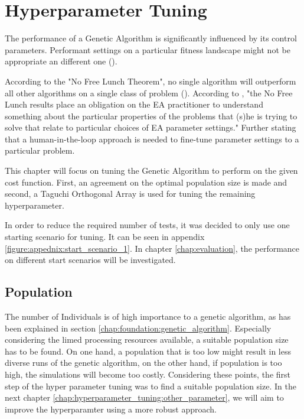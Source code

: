\chapter{Hyperparameter Tuning}
\label{chap:hyperparameter_tuning}

The performance of a Genetic Algorithm is significantly influenced by its control parameters. Performant settings on a particular fitness landscape might not be appropriate an different one (\cite{kacprzyk_parameter_2007}).

According to the "No Free Lunch Theorem", no single algorithm will outperform all other algorithms on a single class of problem (\cite{kacprzyk_parameter_2007}). According to \cite{kacprzyk_parameter_2007}, "the No Free Lunch results place an obligation on the EA practitioner to understand something about the particular properties of the problems that (s)he is trying to solve that relate to particular choices of EA parameter settings."
Further stating that a human-in-the-loop approach is needed to fine-tune parameter settings to a particular problem.

This chapter will focus on tuning the Genetic Algorithm to perform on the given cost function. First, an agreement on the optimal population size is made and second, a Taguchi Orthogonal Array is used for tuning the remaining hyperparameter.

In order to reduce the required number of tests, it was decided to only use one starting scenario for tuning. It can be seen in appendix \ref{figure:appednix:start_scenario_1}. In chapter \ref{chap:evaluation}, the performance on different start scenarios will be investigated.

\section{Population}
\label{chap:hyperparameter_tuning:population}
The number of Individuals is of high importance to a genetic algorithm, as has been explained in section \ref{chap:foundation:genetic_algorithm}. Especially considering the limed processing resources available, a suitable population size has to be found. On one hand, a population that is too low might result in less diverse runs of the genetic algorithm, on the other hand, if population is too high, the simulations will become too costly. Considering these points, the first step of the hyper parameter tuning was to find a suitable population size. In the next chapter \ref{chap:hyperparameter_tuning:other_parameter}, we will aim to improve the hyperparamter using a more robust approach.

